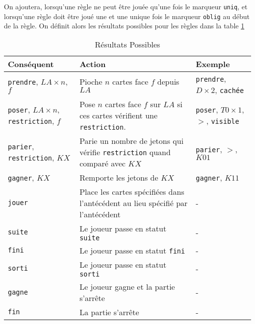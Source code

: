 \documentclass{cours}
\begin{document}
On ajoutera, lorsqu'une règle ne peut être jouée qu'une fois le marqueur \texttt{uniq}, et lorsqu'une règle doit être joué une et une unique fois le marqueur \texttt{oblig} au début de la règle. 
On définit alors les résultats possibles pour les règles dans la table \ref{table:code_cons}
\begin{table}
    \caption{Résultats Possibles}
    \begin{tabular}{>{\centering}m{.2\linewidth}>{\centering}m{.5\linewidth}>{\centering\arraybackslash}m{.2\linewidth}}
        \toprule 
        Conséquent & Action & Exemple \\
        \midrule \midrule
        \texttt{prendre}, $LA \times n$, $f$ & Pioche $n$ cartes face $f$ depuis $LA$ & \texttt{prendre}, $D \times 2$, \texttt{cachée}\\
        \midrule
        \texttt{poser}, $LA \times n$, \texttt{restriction}, $f$ & Pose $n$ cartes face $f$ sur $LA$ si ces cartes vérifient une \texttt{restriction}. & \texttt{poser}, $T0 \times 1$, $>$, \texttt{visible}\\
        \midrule
        \texttt{parier}, \texttt{restriction}, $KX$ & Parie un nombre de jetons qui vérifie \texttt{restriction} quand comparé avec $KX$ & \texttt{parier}, $>$, $K01$\\
        \midrule
        \texttt{gagner}, $KX$ & Remporte les jetons de $KX$ & \texttt{gagner}, $K11$\\
        \midrule
        \texttt{jouer} & Place les cartes spécifiées dans l'antécédent au lieu spécifié par l'antécédent & - \\
        \midrule 
        \texttt{suite} & Le joueur passe en statut \texttt{suite} & - \\
        \midrule 
        \texttt{fini} & Le joueur passe en statut \texttt{fini} & - \\
        \midrule 
        \texttt{sorti} & Le joueur passe en statut \texttt{sorti} & - \\
        \midrule
        \texttt{gagne} & Le joueur gagne et la partie s'arrête & - \\
        \midrule 
        \texttt{fin} & La partie s'arrête & - \\
        \bottomrule
    \end{tabular}
    \label{table:code_cons}
\end{table}
\end{document}
